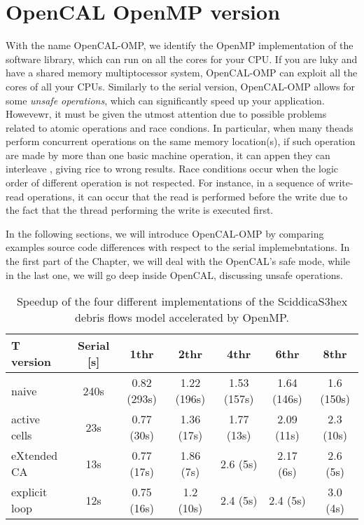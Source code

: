 \chapter{OpenCAL OpenMP version}

With the name OpenCAL-OMP, we identify the OpenMP implementation of
the software library, which can run on all the cores for your CPU. If
you are luky and have a shared memory multiptocessor system,
OpenCAL-OMP can exploit all the cores of all your CPUs. Similarly to
the serial version, OpenCAL-OMP allows for some \emph{unsafe
  operations}, which can significantly speed up your
application. Howevewr, it must be given the utmost attention due to
possible problems related to atomic operations and race condions. In
particular, when many theads perform concurrent operations on the same
memory location(s), if such operation are made by more than one basic
machine operation, it can appen they can interleave , giving rice to
wrong results. Race conditions occur when the logic order of different
operation is not respected. For instance, in a sequence of write-read
operations, it can occur that the read is performed before the write
due to the fact that the thread performing the write is executed
first.

In the following sections, we will introduce OpenCAL-OMP by comparing
examples source code differences with respect to the serial
implemebntations. In the first part of the Chapter, we will deal with
the OpenCAL's safe mode, while in the last one, we will go deep inside
OpenCAL, discussing unsafe operations.


\begin{table}
  \centering
  \begin{tabular}{l|c|c|c|c|c|c}
    \hline
    T version & Serial [s] & 1thr & 2thr & 4thr & 6thr & 8thr\\
    \hline
    \hline
    naive         & 240s & 0.82 (293s) & 1.22 (196s) & 1.53 (157s) & 1.64 (146s) & 1.6 (150s)\\
    active cells  & 23s  & 0.77 (30s)  & 1.36 (17s)  & 1.77 (13s)  & 2.09 (11s)  & 2.3 (10s)\\
    eXtended CA   & 13s  & 0.77 (17s)  & 1.86 (7s)   & 2.6  (5s)   & 2.17  (6s)  & 2.6 (5s)\\
    explicit loop & 12s  & 0.75 (16s)  & 1.2  (10s)  & 2.4  (5s)   & 2.4  (5s)   & 3.0 (4s)\\
    \hline
  \end{tabular}
  \caption{Speedup of the four different
    implementations of the SciddicaS3hex debris flows model accelerated by OpenMP.}
  \label{tab:speedup}
\end{table} 

